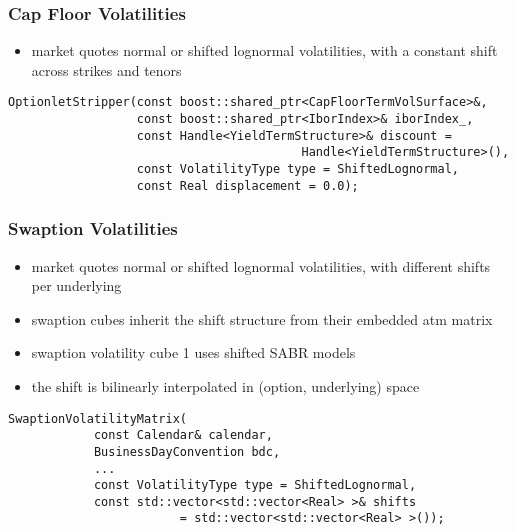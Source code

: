 \documentclass{beamer}
\begin{document}
\begin{frame}[fragile]
\frametitle{Cap Floor Volatilities}
\begin{itemize}
\item market quotes normal or shifted lognormal volatilities, with a constant shift across strikes and tenors
\end{itemize}
\begin{verbatim}
OptionletStripper(const boost::shared_ptr<CapFloorTermVolSurface>&,
                  const boost::shared_ptr<IborIndex>& iborIndex_,
                  const Handle<YieldTermStructure>& discount =
                                         Handle<YieldTermStructure>(),
                  const VolatilityType type = ShiftedLognormal,
                  const Real displacement = 0.0);
\end{verbatim}
\end{frame}

\begin{frame}[fragile]
\frametitle{Swaption Volatilities}
\begin{itemize}
\item market quotes normal or shifted lognormal volatilities, with different shifts per underlying
\item swaption cubes inherit the shift structure from their embedded atm matrix
\item swaption volatility cube 1 uses shifted SABR models
\item the shift is bilinearly interpolated in (option, underlying) space
\end{itemize}
\begin{verbatim}
SwaptionVolatilityMatrix(
            const Calendar& calendar,
            BusinessDayConvention bdc,
            ...
            const VolatilityType type = ShiftedLognormal,
            const std::vector<std::vector<Real> >& shifts
                        = std::vector<std::vector<Real> >());
\end{verbatim}
\end{frame}
\end{document}
